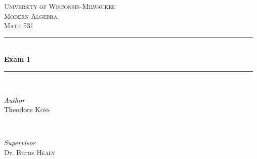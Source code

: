 \documentclass[hidelinks,12pt]{article}
\title{\scalebox{2}{Math 531 Exam 1}}
\author{\scalebox{1.5}{Theo Koss}}
\date{March 2021}
\begin{document}
\begin{titlepage} %
	\newcommand{\HRule}{\rule{\linewidth}{0.5mm}} %
	
	\center %
	
	
	\textsc{\LARGE University of Wisconsin-Milwaukee}\\[1.5cm] %
	
	\textsc{\Large Modern Algebra}\\[0.5cm] %
	
	\textsc{\large Math 531}\\[0.5cm] %
	
	
	\HRule\\[0.4cm]
	
	{\huge\bfseries Exam 1}\\[0.4cm] %
	
	\HRule\\[1.5cm]
	
	
	\begin{minipage}{0.4\textwidth}
		\begin{flushleft}
			\large
			\textit{Author}\\
			Theodore \textsc{Koss} %
		\end{flushleft}
	\end{minipage}
	~
	\begin{minipage}{0.4\textwidth}
		\begin{flushright}
			\large
			\textit{Supervisor}\\
			Dr. Burns \textsc{Healy} %
		\end{flushright}
	\end{minipage}
	
	

\end{titlepage}
\end{document}
